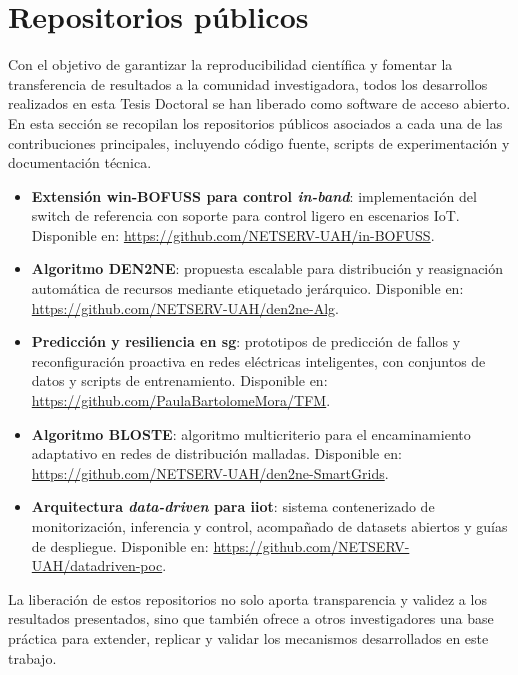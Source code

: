 \chapter{Repositorios públicos}
\label{ch:repositorios}

Con el objetivo de garantizar la reproducibilidad científica y fomentar la transferencia de resultados a la comunidad investigadora, todos los desarrollos realizados en esta Tesis Doctoral se han liberado como software de acceso abierto. En esta sección se recopilan los repositorios públicos asociados a cada una de las contribuciones principales, incluyendo código fuente, scripts de experimentación y documentación técnica.

\begin{itemize}
    \item \textbf{Extensión win-BOFUSS para control \textit{in-band}}: implementación del switch de referencia con soporte para control ligero en escenarios IoT. Disponible en: \url{https://github.com/NETSERV-UAH/in-BOFUSS}.
    
    \item \textbf{Algoritmo DEN2NE}: propuesta escalable para distribución y reasignación automática de recursos mediante etiquetado jerárquico. Disponible en: \url{https://github.com/NETSERV-UAH/den2ne-Alg}.
    
    \item \textbf{Predicción y resiliencia en \gls{sg}}: prototipos de predicción de fallos y reconfiguración proactiva en redes eléctricas inteligentes, con conjuntos de datos y scripts de entrenamiento. Disponible en: \url{https://github.com/PaulaBartolomeMora/TFM}.
    
    \item \textbf{Algoritmo BLOSTE}: algoritmo multicriterio para el encaminamiento adaptativo en redes de distribución malladas. Disponible en: \url{https://github.com/NETSERV-UAH/den2ne-SmartGrids}.
    
    \item \textbf{Arquitectura \textit{data-driven} para \gls{iiot}}: sistema contenerizado de monitorización, inferencia y control, acompañado de datasets abiertos y guías de despliegue. Disponible en: \url{https://github.com/NETSERV-UAH/datadriven-poc}.
\end{itemize}

La liberación de estos repositorios no solo aporta transparencia y validez a los resultados presentados, sino que también ofrece a otros investigadores una base práctica para extender, replicar y validar los mecanismos desarrollados en este trabajo.
